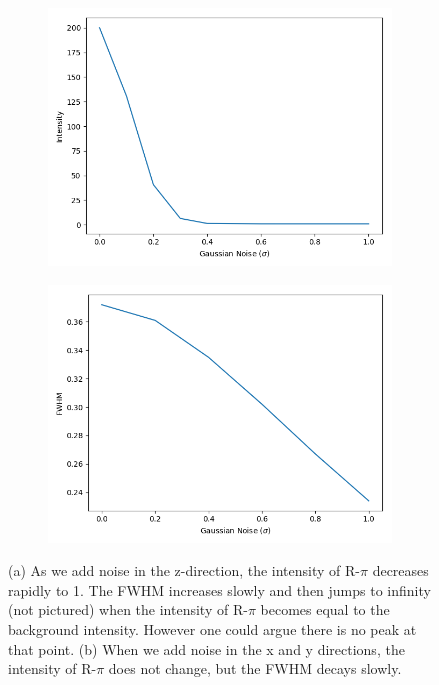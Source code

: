 \documentclass{article}
\begin{document}
  \begin{figure}
  \centering
  \begin{subfigure}{0.45\textwidth}
  \includegraphics[width=\textwidth]{random_layers_z_noise.png}
  \caption{}\label{fig:random_layers_z_noise}
  \end{subfigure}
  \begin{subfigure}{0.45\textwidth}
  \includegraphics[width=\textwidth]{random_layers_xy_noise.png}
  \caption{}\label{fig:random_layers_xy_noise}
  \end{subfigure}
  \caption{(a) As we add noise in the z-direction, the intensity of R-$\pi$ decreases
   rapidly to 1. The FWHM increases slowly and then jumps to infinity (not pictured) 
   when the intensity of R-$\pi$ becomes equal to the background intensity. However one 
   could argue there is no peak at that point. (b) When we add noise in the x and y 
   directions, the intensity of R-$\pi$ does not change, but the FWHM decays slowly.}\label{fig:layers_noise}
  \end{figure}
\end{document}
